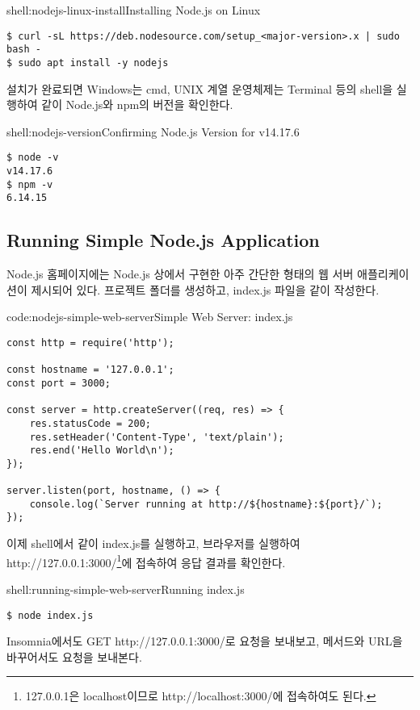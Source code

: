 \begin{shellenv}{shell:nodejs-linux-install}{Installing Node.js on Linux}\begin{verbatim}
$ curl -sL https://deb.nodesource.com/setup_<major-version>.x | sudo bash -
$ sudo apt install -y nodejs
\end{verbatim}
\end{shellenv}

설치가 완료되면 Windows는 cmd, UNIX 계열 운영체제는 Terminal 등의 shell을 실행하여 \과 같이 Node.js와 npm의 버전을 확인한다.

\begin{shellenv}{shell:nodejs-version}{Confirming Node.js Version for v14.17.6}\begin{verbatim}
$ node -v
v14.17.6
$ npm -v
6.14.15
\end{verbatim}
\end{shellenv}

\subsection*{Running Simple Node.js Application}

Node.js 홈페이지에는 Node.js 상에서 구현한 아주 간단한 형태의 웹 서버 애플리케이션이 제시되어 있다. 프로젝트 폴더를 생성하고, index.js 파일을 \와 같이 작성한다.

\begin{codeenv}{code:nodejs-simple-web-server}{Simple Web Server: index.js}\begin{verbatim}
const http = require('http');

const hostname = '127.0.0.1';
const port = 3000;

const server = http.createServer((req, res) => {
    res.statusCode = 200;
    res.setHeader('Content-Type', 'text/plain');
    res.end('Hello World\n');
});

server.listen(port, hostname, () => {
    console.log(`Server running at http://${hostname}:${port}/`);
});
\end{verbatim}
\end{codeenv}

이제 shell에서 \와 같이 index.js를 실행하고, 브라우저를 실행하여 http://127.0.0.1:3000/\footnote{127.0.0.1은 localhost이므로 http://localhost:3000/에 접속하여도 된다.}에 접속하여 응답 결과를 확인한다.

\begin{shellenv}{shell:running-simple-web-server}{Running index.js}\begin{verbatim}
$ node index.js
\end{verbatim}
\end{shellenv}

Insomnia에서도 GET http://127.0.0.1:3000/로 요청을 보내보고, 메서드와 URL을 바꾸어서도 요청을 보내본다.
